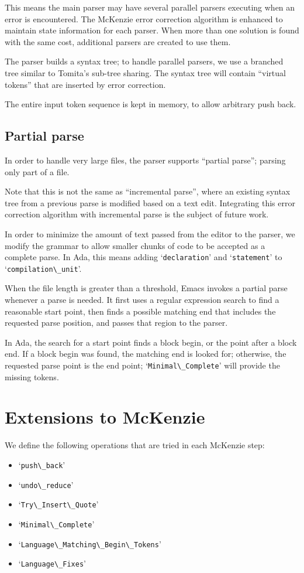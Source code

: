 \documentclass{article}
\newcommand{\code}[1]{`\lstinline|#1|'}
\begin{document}
This means the main parser may have several parallel parsers executing
when an error is encountered. The McKenzie error correction algorithm
is enhanced to maintain state information for each parser. When more
than one solution is found with the same cost, additional parsers are
created to use them.

The parser builds a syntax tree; to handle parallel parsers, we use a
branched tree similar to Tomita's sub-tree sharing. The syntax tree
will contain ``virtual tokens'' that are inserted by error correction.

The entire input token sequence is kept in memory, to allow arbitrary
push back.

\subsection{Partial parse}
In order to handle very large files, the parser supports ``partial
parse''; parsing only part of a file.

Note that this is not the same as ``incremental parse'', where an
existing syntax tree from a previous parse is modified based on a text
edit. Integrating this error correction algorithm with incremental
parse is the subject of future work.

In order to minimize the amount of text passed from the editor to the
parser, we modify the grammar to allow smaller chunks of code to be
accepted as a complete parse. In Ada, this means adding
\code{declaration} and \code{statement} to \code{compilation\_unit}.

When the file length is greater than a threshold, Emacs invokes a
partial parse whenever a parse is needed. It first uses a regular
expression search to find a reasonable start point, then finds a
possible matching end that includes the requested parse position, and
passes that region to the parser.

In Ada, the search for a start point finds a block begin, or the point
after a block end. If a block begin was found, the matching end is
looked for; otherwise, the requested parse point is the end point;
\code{Minimal\_Complete} will provide the missing tokens.

\section{Extensions to McKenzie}
We define the following operations that are tried in each McKenzie
step:
\begin{itemize}
\item \code{push\_back}
\item \code{undo\_reduce}
\item \code{Try\_Insert\_Quote}
\item \code{Minimal\_Complete}
\item \code{Language\_Matching\_Begin\_Tokens}
\item \code{Language\_Fixes}
\end{itemize}
\end{document}
